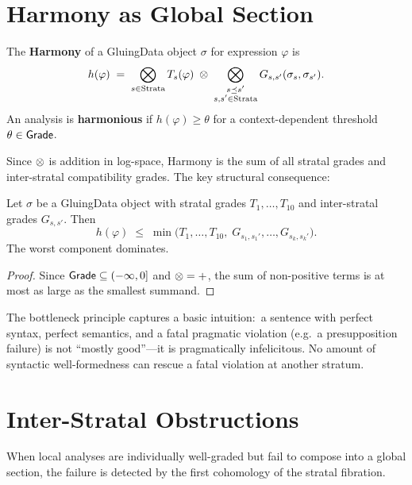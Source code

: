 \section{Harmony as Global Section}
\label{sec:harmony-global}

\begin{definition}[Harmony]
\label{def:harmony}
The \textbf{Harmony} of a GluingData object $\sigma$ for expression
$\varphi$ is
\[
  h(\varphi) \;=\;
  \bigotimes_{s \in \mathrm{Strata}} T_s(\varphi)
  \;\otimes\;
  \bigotimes_{\substack{s \preceq s' \\ s, s' \in \mathrm{Strata}}}
  G_{s,s'}(\sigma_s, \sigma_{s'}).
\]
An analysis is \textbf{harmonious} if $h(\varphi) \geq \theta$ for
a context-dependent threshold $\theta \in \mathsf{Grade}$.
\end{definition}

Since $\otimes$ is addition in log-space, Harmony is the sum of all
stratal grades and inter-stratal compatibility grades.  The key
structural consequence:

\begin{proposition}
\label{prop:bottleneck}
Let $\sigma$ be a GluingData object with stratal grades
$T_1, \ldots, T_{10}$ and inter-stratal grades
$G_{s,s'}$.  Then
\[
  h(\varphi) \;\leq\; \min\bigl(
  T_1, \ldots, T_{10},\;
  G_{s_1,s_1'}, \ldots, G_{s_k,s_k'}\bigr).
\]
The worst component dominates.
\end{proposition}

\begin{proof}
Since $\mathsf{Grade} \subseteq (-\infty, 0]$ and $\otimes = {+}$, the sum
of non-positive terms is at most as large as the smallest summand.
\end{proof}

\begin{remark}
The bottleneck principle captures a basic intuition:\ a sentence with
perfect syntax, perfect semantics, and a fatal pragmatic violation
(e.g.\ a presupposition failure) is not ``mostly good''---it is
pragmatically infelicitous.  No amount of syntactic well-formedness
can rescue a fatal violation at another stratum.
\end{remark}

\section{Inter-Stratal Obstructions}
\label{sec:inter-stratal-obstructions}

When local analyses are individually well-graded but fail to compose
into a global section, the failure is detected by the first
cohomology of the stratal fibration.

